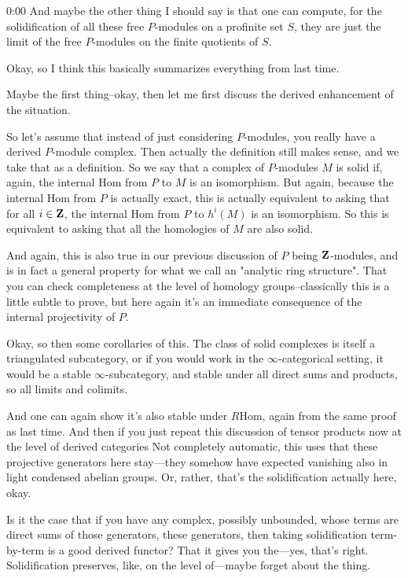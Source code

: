 \begin{unfinished}{0:00}
And maybe the other thing I should say is that one can compute, for the solidification of all these free $P$-modules on a profinite set $S$, they are just the limit of the free $P$-modules on the finite quotients of $S$.

Okay, so I think this basically summarizes everything from last time.

Maybe the first thing--okay, then let me first discuss the derived enhancement of the situation.

So let's assume that instead of just considering $P$-modules, you really have a derived $P$-module complex. Then actually the definition still makes sense, and we take that as a definition. So we say that a complex of $P$-modules $M$ is solid if, again, the internal $\mathrm{Hom}$ from $P$ to $M$ is an isomorphism. But again, because the internal $\mathrm{Hom}$ from $P$ is actually exact, this is actually equivalent to asking that for all $i \in \mathbf Z$, the internal $\mathrm{Hom}$ from $P$ to $h^i(M)$ is an isomorphism. So this is equivalent to asking that all the homologies of $M$ are also solid.

And again, this is also true in our previous discussion of $P$ being $\mathbf Z$-modules, and is in fact a general property for what we call an "analytic ring structure". That you can check completeness at the level of homology groups--classically this is a little subtle to prove, but here again it's an immediate consequence of the internal projectivity of $P$.

Okay, so then some corollaries of this. The class of solid complexes is itself a triangulated subcategory, or if you would work in the $\infty$-categorical setting, it would be a stable $\infty$-subcategory, and stable under all direct sums and products, so all limits and colimits.

And one can again show it's also stable under $R\mathrm{Hom}$, again from the same proof as last time. And then if you just repeat this discussion of tensor products now at the level of derived categories
Not completely automatic, this uses that these projective generators here stay---they somehow have expected vanishing also in light condensed abelian groups. Or, rather, that's the solidification actually here, okay.

Is it the case that if you have any complex, possibly unbounded, whose terms are direct sums of those generators, these generators, then taking solidification term-by-term is a good derived functor? That it gives you the---yes, that's right. Solidification preserves, like, on the level of---maybe forget about the thing.


\end{unfinished}
